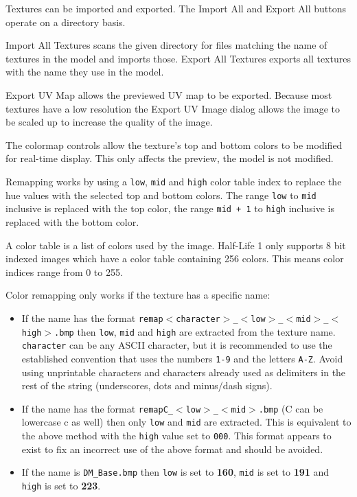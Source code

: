 \documentclass[10pt, a4paper, titlepage, oneside]{article}
\newcommand{\code}[1]{\mbox{\texttt{#1}}}
\begin{document}
\vspace{\baselineskip}
Textures can be imported and exported. The Import All and Export All buttons operate on a directory basis.

\vspace{\baselineskip}
Import All Textures scans the given directory for files matching the name of textures in the model and imports those. Export All Textures exports all textures with the name they use in the model.

\vspace{\baselineskip}
Export UV Map allows the previewed UV map to be exported. Because most textures have a low resolution the Export UV Image dialog allows the image to be scaled up to increase the quality of the image.

\vspace{\baselineskip}
The colormap controls allow the texture's top and bottom colors to be modified for real-time display. This only affects the preview, the model is not modified.

\vspace{\baselineskip}
Remapping works by using a \code{low}, \code{mid} and \code{high} color table index to replace the hue values with the selected top and bottom colors. The range \code{low} to \code{mid} inclusive is replaced with the top color, the range \code{mid + 1} to \code{high} inclusive is replaced with the bottom color.

\vspace{\baselineskip}
A color table is a list of colors used by the image. Half-Life 1 only supports 8 bit indexed images which have a color table containing 256 colors. This means color indices range from 0 to 255.

\newpage

\vspace{\baselineskip}
Color remapping only works if the texture has a specific name:

\begin{itemize}
\item If the name has the format \code{remap$<$character$>$\_$<$low$>$\_$<$mid$>$\_$<$high$>$.bmp} then \code{low}, \code{mid} and \code{high} are extracted from the texture name. \code{character} can be any ASCII character, but it is recommended to use the established convention that uses the numbers \code{1-9} and the letters \code{A-Z}. Avoid using unprintable characters and characters already used as delimiters in the rest of the string (underscores, dots and minus/dash signs).
\item If the name has the format \code{remapC\_$<$low$>$\_$<$mid$>$.bmp} (C can be lowercase c as well) then only \code{low} and \code{mid} are extracted. This is equivalent to the above method with the \code{high} value set to \code{000}. This format appears to exist to fix an incorrect use of the above format and should be avoided.
\item If the name is \code{DM\_Base.bmp} then \code{low} is set to \textbf{160}, \code{mid} is set to \textbf{191} and \code{high} is set to \textbf{223}.
\end{itemize}
\end{document}
